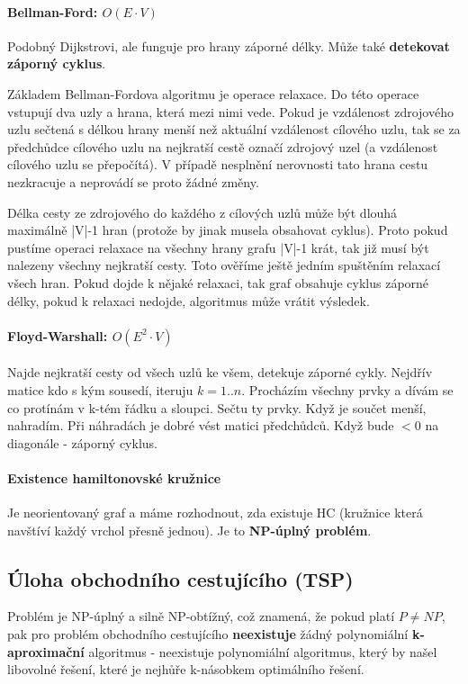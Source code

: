 \paragraph{Bellman-Ford: $O(E\cdot V)$} Podobný Dijkstrovi, ale funguje pro hrany záporné délky. Může také \textbf{detekovat záporný cyklus}. 

Základem Bellman-Fordova algoritmu je operace relaxace. Do této operace vstupují dva uzly a hrana, která mezi nimi vede. Pokud je vzdálenost zdrojového uzlu sečtená s délkou hrany menší než aktuální vzdálenost cílového uzlu, tak se za předchůdce cílového uzlu na nejkratší cestě označí zdrojový uzel (a vzdálenost cílového uzlu se přepočítá). V případě nesplnění nerovnosti tato hrana cestu nezkracuje a neprovádí se proto žádné změny.

Délka cesty ze zdrojového do každého z cílových uzlů může být dlouhá maximálně |V|-1 hran (protože by jinak musela obsahovat cyklus). Proto pokud pustíme operaci relaxace na všechny hrany grafu |V|-1 krát, tak již musí být nalezeny všechny nejkratší cesty. Toto ověříme ještě jedním spuštěním relaxací všech hran. Pokud dojde k nějaké relaxaci, tak graf obsahuje cyklus záporné délky, pokud k relaxaci nedojde, algoritmus může vrátit výsledek.

\paragraph{Floyd-Warshall: $O(E^2 \cdot V)$} Najde nejkratší cesty od všech uzlů ke všem, detekuje záporné cykly. Nejdřív matice kdo s kým sousedí, iteruju $k=1..n$. Procházím všechny prvky a dívám se co protínám v k-tém řádku a sloupci. Sečtu ty prvky. Když je součet menší, nahradím. Při náhradách je dobré vést matici předchůdců. Když bude $<0$ na diagonále - záporný cyklus.

\paragraph{Existence hamiltonovské kružnice} Je neorientovaný graf a máme rozhodnout, zda existuje HC (kružnice která navštíví každý vrchol přesně jednou). Je to \textbf{NP-úplný problém}.

\subsection{Úloha obchodního cestujícího (TSP)}

Problém je NP-úplný a silně NP-obtížný, což znamená, že pokud platí $P \neq NP$, pak pro problém obchodního cestujícího \textbf{neexistuje} žádný polynomiální \textbf{k-aproximační} algoritmus - neexistuje polynomiální algoritmus, který by našel libovolné řešení, které je nejhůře k-násobkem optimálního řešení.

